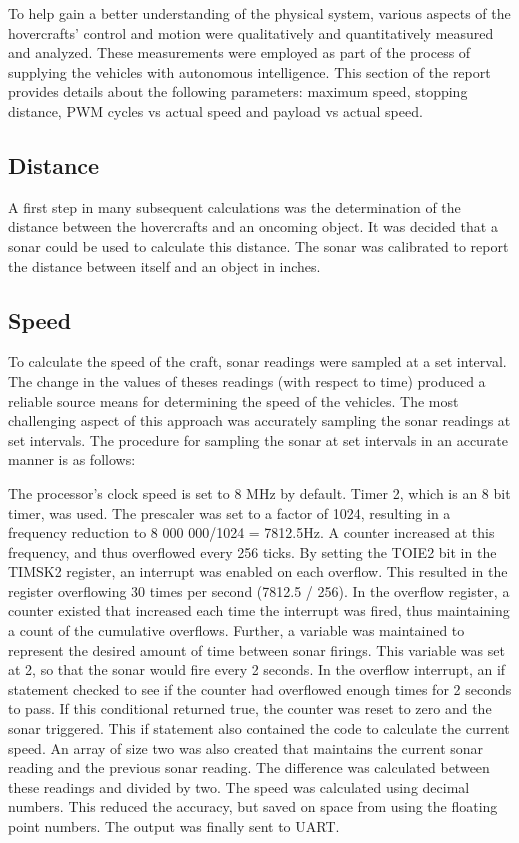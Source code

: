 To help gain a better understanding of the physical system, various aspects of the hovercrafts' control and motion were qualitatively and quantitatively measured and analyzed. These measurements were employed as part of the process of supplying the vehicles with autonomous intelligence. This section of the report provides details about the following parameters: maximum speed, stopping distance, PWM cycles vs actual speed and payload vs actual speed.

\subsection{Distance}
A first step in many subsequent calculations was the determination of the distance between the hovercrafts and an oncoming object. It was decided that a sonar could be used to calculate this distance. The sonar was calibrated to report the distance between itself and an object in inches.

\subsection{Speed}
To calculate the speed of the craft, sonar readings were sampled at a set interval.  The change in the values of theses readings (with respect to time) produced a reliable source means for determining the speed of the vehicles.  The most challenging aspect of this approach was accurately sampling the sonar readings at set intervals.  The procedure for sampling the sonar at set intervals in an accurate manner is as follows:

The processor's clock speed is set to 8 MHz by default.  Timer 2, which is an 8 bit timer, was used. The prescaler was set to a factor of 1024, resulting in a frequency reduction to 8 000 000/1024 = 7812.5Hz. A counter increased at this frequency, and thus  overflowed every 256 ticks. By setting the TOIE2 bit in the TIMSK2 register, an interrupt was enabled on each overflow. This resulted in the register overflowing 30 times per second (7812.5 / 256). In the overflow register, a counter existed that increased each time the interrupt was fired, thus maintaining a count of the cumulative overflows.  Further, a variable was maintained to represent the desired amount of time between sonar firings. This variable was set at 2, so that the sonar would fire every 2 seconds. In the overflow interrupt, an if statement checked to see if the counter had overflowed enough times for 2 seconds to pass. If this conditional returned true, the counter was reset to zero and the sonar triggered. This if statement also contained the code to calculate the current speed. An array of size two was also created that maintains the current sonar reading and the previous sonar reading. The difference was calculated between these readings and divided by two. The speed was calculated using decimal numbers. This reduced the accuracy, but saved on space from using the floating point numbers. The output was finally sent to UART.

